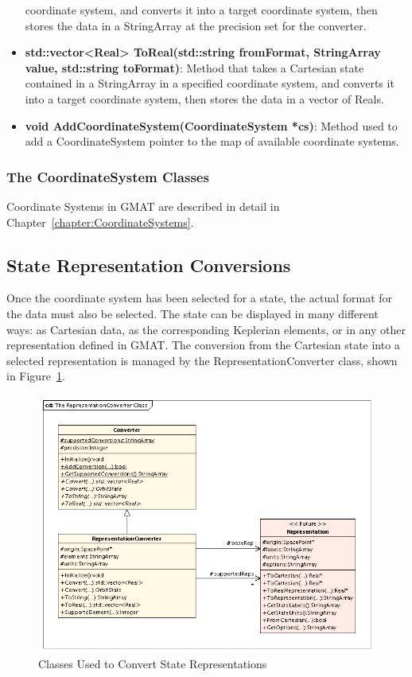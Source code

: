 \begin{itemize}
coordinate system, and converts it into a target coordinate system, then stores the data in a
StringArray at the precision set for the converter.
\item \textbf{std::vector<Real> ToReal(std::string fromFormat, StringArray value, std::string
toFormat)}: Method that takes a Cartesian state contained in a StringArray in a specified
coordinate system, and converts it into a target coordinate system, then stores the data in a
vector of Reals.
\item \textbf{void AddCoordinateSystem(CoordinateSystem *cs)}: Method used to add a CoordinateSystem
pointer to the map of available coordinate systems.
\end{itemize}

\subsubsection{The CoordinateSystem Classes}

Coordinate Systems in GMAT are described in detail in Chapter~\ref{chapter:CoordinateSystems}.

\subsection{State Representation Conversions}

Once the coordinate system has been selected for a state, the actual format for the data must also
be selected.  The state can be displayed in many different ways: as Cartesian data, as the
corresponding Keplerian elements, or in any other representation defined in GMAT.  The conversion
from the Cartesian state into a selected representation is managed by the RepresentationConverter
class, shown in Figure~\ref{figure:RepresentationConverterClasses}.

\begin{figure}[htb]
\begin{center}
\includegraphics[450,293]{Images/TheRepresentationConverterClass.png}
\caption{\label{figure:RepresentationConverterClasses}Classes Used to Convert State Representations}
\end{center}
\end{figure}

